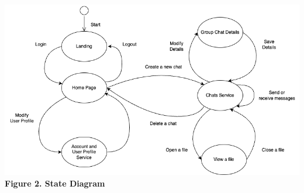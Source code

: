 \documentclass[]{article}
\begin{document}
\begin{center}
\includegraphics[scale=0.50]{state-diagram.png}\\
\caption{\textbf{Figure 2. State Diagram}}
\end{center}
\end{document}
